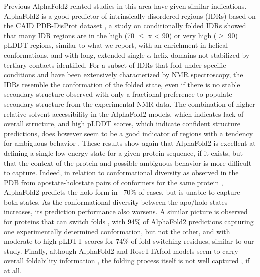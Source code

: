 Previous AlphaFold2-related studies in this area have given similar indications. AlphaFold2 is a good predictor of intrinsically disordered regions (IDRs) based on the CAID PDB-DisProt dataset \cite{piovesan_intrinsic_2022}, a study on conditionally folded IDRs \cite{alderson_systematic_2022} showed that many IDR regions are in the high (70 $\leq$ x < 90) or very high ($\geq$ 90) pLDDT regions, similar to what we report, with an enrichment in helical conformations, and with long, extended single $\alpha$-helix domains not stabilized by tertiary contacts identified. For a subset of IDRs that fold under specific conditions and have been extensively characterized by NMR spectroscopy, the IDRs resemble the conformation of the folded state, even if there is no stable secondary structure observed with only a fractional preference to populate secondary structure from the experimental NMR data. The combination of higher relative solvent accessibility in the AlphaFold2 models, which indicates lack of overall structure, and high pLDDT scores, which indicate confident structure predictions, does however seem to be a good indicator of regions with a tendency for ambiguous behavior \cite{piovesan_intrinsic_2022}. These results show again that AlphaFold2 is excellent at defining a single low energy state for a given protein sequence, if it exists, but that the context of the protein and possible ambiguous behavior is more difficult to capture. Indeed, in relation to conformational diversity as observed in the PDB from \gls{apostate}-\gls{holostate} pairs of conformers for the same protein \cite{saldano_impact_2022}, AlphaFold2 predicts the holo form in ~70\% of cases, but is unable to capture both states. As the conformational diversity between the apo/holo states increases, its prediction performance also worsens. A similar picture is observed for proteins that can switch folds \cite{chakravarty_alphafold2_2022}, with 94\% of AlphaFold2 predictions capturing one experimentally determined conformation, but not the other, and with moderate-to-high pLDTT scores for 74\% of fold-switching residues, similar to our study. Finally, although AlphaFold2 and RoseTTAfold models seem to carry overall foldability information \cite{liu_computational_2022}, the folding process itself is not well captured \cite{outeiral_current_2022}, if at all.

